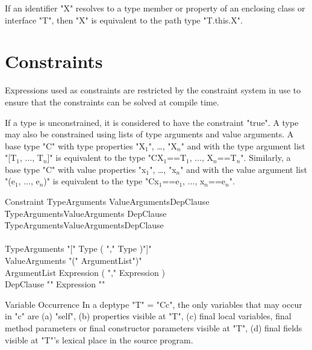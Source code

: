 If an identifier \xcd"X" resolves to a type member or property
of an enclosing class or interface \xcd"T", then \xcd"X" is equivalent to
the path type \xcd"T.this.X".

\section{Constraints}\label{DepTypes}

Expressions used as constraints are restricted by the
constraint system in use to ensure that the constraints can
be solved at compile time.

If a type is unconstrained, it is considered to have the
constraint \xcd"true".
A type may also be constrained using lists of type arguments and
value arguments.  A base type \xcd"C" with type properties
\xcdmath"X$_1$", \dots,
\xcdmath"X$_n$" and
with the type argument list
\xcdmath"[T$_1$, $\dots$, T$_n$]" is equivalent to the type
\xcdmath"C{X$_1$==T$_1$, $\dots$, X$_n$==T$_n$}".
Similarly, a base type \xcd"C" with value properties
\xcdmath"x$_1$", \dots,
\xcdmath"x$_n$" and
with the value argument list
\xcdmath"(e$_1$, $\dots$, e$_n$)" is equivalent to the type
\xcdmath"C{x$_1$==e$_1$, $\dots$, x$_n$==e$_n$}".

\def\withmath#1{\relax\ifmmode#1\else{$#1$}\fi}
\def\LL#1{\withmath{\lbrack\!\lbrack #1\rbrack\!\rbrack}}

\begin{grammar}
Constraint \: TypeArguments     ValueArguments\opt DepClause\opt \\
           \| TypeArguments\opt ValueArguments     DepClause\opt \\
           \| TypeArguments\opt ValueArguments\opt DepClause     \\
           \\
TypeArguments    \:  \xcd"[" Type ( \xcd"," Type )\star \xcd"]" \\
ValueArguments   \:  \xcd"(" ArgumentList\opt \xcd")" \\
ArgumentList     \:  Expression ( \xcd"," Expression )\star \\
DepClause        \: \xcd"{" Expression \xcd"}" \\
\end{grammar}

\begin{staticrule}{Variable Occurrence}
In a deptype \xcd"T" = \xcd"C{c}", the only variables that may
occur in \xcd"c" are (a)
\xcd"self", (b) properties visible at \xcd"T", (c) final local variables, final
method parameters or final constructor parameters visible at \xcd"T", (d)
final fields visible at \xcd"T"'s lexical place in the source program.  
\end{staticrule}

